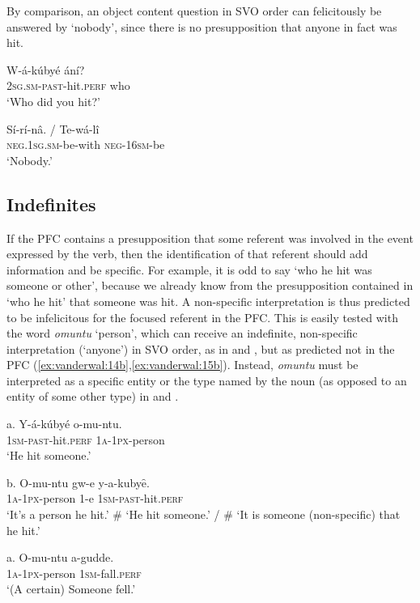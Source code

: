 \documentclass[output=paper]{langsci/langscibook}
\begin{document}
By comparison, an object content question in SVO order  can felicitously be answered by ‘nobody’, since there is no presupposition that anyone in fact was hit.

\ea
\gll W-á-kúbyé    ání?\\
     \textsc{2sg.sm-past}-hit.\textsc{perf}  who\\
\glt ‘Who did you hit?’
\z

\ea
\gll Sí-rí-nâ.      /   Te-wá-lî\\
     \textsc{neg.1sg.sm}-be-with    \textsc{neg-16sm}-be\\
\glt ‘Nobody.’
\z

\subsection{Indefinites} %

If the PFC contains a presupposition that some referent was involved in the event expressed by the verb, then the identification of that referent should add information and be specific. For example, it is odd to say ‘who he hit was someone or other’, because we already know from the presupposition contained in ‘who he hit’ that someone was hit. A non-specific interpretation is thus predicted to be infelicitous for the focused referent in the PFC. This is easily tested with the word \textit{omuntu} ‘person’, which can receive an indefinite, non-specific interpretation (‘anyone’) in SVO order, as in  and , but as predicted not in the PFC (\ref{ex:vanderwal:14b},\ref{ex:vanderwal:15b}). Instead, \textit{omuntu} must be interpreted as a specific entity or the type named by the noun (as opposed to an entity of some other type) in  and .

\ea
\gll   a.  Y-á-kúbyé    o-mu-ntu.\\
         \textsc{1sm-past}-hit.\textsc{perf}  \textsc{1a-1px}-person\\
\glt     ‘He hit someone.’
\z

\ea
\gll   b.  O-mu-ntu    gw-e  y-a-kubyȇ.\\
         \textsc{1a-1px}-person  1-e  \textsc{1sm-past}-hit.\textsc{perf}\\
\glt     ‘It’s a person he hit.’ 
\glt     \# ‘He hit someone.’ / \# ‘It is someone (non-specific) that he hit.’
\z

\ea
\gll   a.  O-mu-ntu    a-gudde.\\
         \textsc{1a-1px}-person  1\textsc{sm}-fall.\textsc{perf}\\
\glt     ‘(A certain) Someone fell.’
\z
\end{document}
